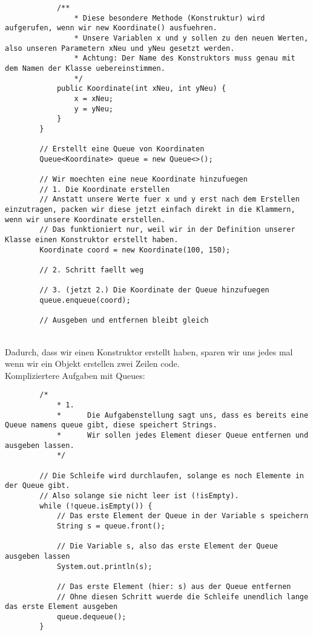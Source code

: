 \begin{flushleft}
\begin{lstlisting}
            /** 
                * Diese besondere Methode (Konstruktur) wird aufgerufen, wenn wir new Koordinate() ausfuehren.
                * Unsere Variablen x und y sollen zu den neuen Werten, also unseren Parametern xNeu und yNeu gesetzt werden.
                * Achtung: Der Name des Konstruktors muss genau mit dem Namen der Klasse uebereinstimmen.
                */
            public Koordinate(int xNeu, int yNeu) {
                x = xNeu;
                y = yNeu;
            }
        }
        
        // Erstellt eine Queue von Koordinaten
        Queue<Koordinate> queue = new Queue<>();
        
        // Wir moechten eine neue Koordinate hinzufuegen
        // 1. Die Koordinate erstellen
        // Anstatt unsere Werte fuer x und y erst nach dem Erstellen einzutragen, packen wir diese jetzt einfach direkt in die Klammern, wenn wir unsere Koordinate erstellen.
        // Das funktioniert nur, weil wir in der Definition unserer Klasse einen Konstruktor erstellt haben.
        Koordinate coord = new Koordinate(100, 150);

        // 2. Schritt faellt weg

        // 3. (jetzt 2.) Die Koordinate der Queue hinzufuegen
        queue.enqueue(coord);
    
        // Ausgeben und entfernen bleibt gleich
    \end{lstlisting}
     \\
    Dadurch, dass wir einen Konstruktor erstellt haben, sparen wir uns jedes mal wenn wir ein Objekt erstellen zwei Zeilen code. \\
    Kompliziertere Aufgaben mit Queues:
    \begin{lstlisting}
        /*
            * 1. 
            *      Die Aufgabenstellung sagt uns, dass es bereits eine Queue namens queue gibt, diese speichert Strings.
            *      Wir sollen jedes Element dieser Queue entfernen und ausgeben lassen.
            */

        // Die Schleife wird durchlaufen, solange es noch Elemente in der Queue gibt.
        // Also solange sie nicht leer ist (!isEmpty).
        while (!queue.isEmpty()) {
            // Das erste Element der Queue in der Variable s speichern
            String s = queue.front();

            // Die Variable s, also das erste Element der Queue ausgeben lassen
            System.out.println(s);

            // Das erste Element (hier: s) aus der Queue entfernen
            // Ohne diesen Schritt wuerde die Schleife unendlich lange das erste Element ausgeben
            queue.dequeue();
        }
    \end{lstlisting}
\end{flushleft}

